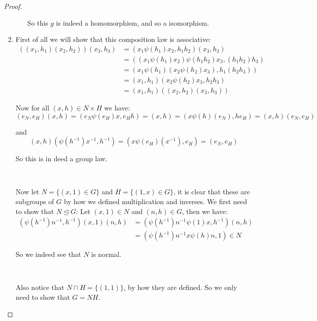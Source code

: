 \begin{exercise}
\begin{proof}
\begin{enumerate}[label = (\alph*)]
\begin{itemize}
                    So this $g$ is indeed a homomorphism, and so a isomorphism. 
                \end{itemize}
                \item First of all we will show that this composition law is associative:\begin{align*}
                    ((x_1,h_1)(x_2,h_2))(x_3,h_3) &= ({x_1}{\psi(h_1)x_2}, h_1h_2)(x_3,h_3)\\
                    &= (({x_1}{\psi(h_1)x_2}){\psi(h_1h_2)x_3}, (h_1h_2)h_3)\\
                    &= ({x_1}\psi(h_1)({x_2}{\psi(h_2)x_3}), h_1(h_2h_3))\\
                    &=(x_1,h_1)({x_2}{\psi(h_2)x_3}, h_2h_3)\\
                    &=(x_1,h_1)((x_2,h_2)(x_3,h_3))
                \end{align*}

                Now for all $(x,h)\in N\times H$ we have:\begin{equation*}
                    (e_N,e_H)(x,h) = (e_N\psi(e_H)x,{e_H}h) = (x,h) = (x\psi(h)(e_N),h{e_H}) = (x,h)(e_N,e_H) 
                \end{equation*}

                and \begin{equation*}
                    (x,h)(\psi(h^{-1})x^{-1},h^{-1}) = (x\psi(e_H)(x^{-1}),e_H) = (e_N,e_H)
                \end{equation*}

                So this is in deed a group law.

                \

                Now let $N = \{(x,1)\in G\}$ and $H = \{(1,x)\in G\}$, it is clear that these are subgroups of $G$ by how we defined multiplication and inverses.
                 We first need to show that $N\trianglelefteq G$:
                Let $(x,1)\in N$ and $(n,h)\in G$, then we have:\begin{align*}
                    (\psi(h^{-1})n^{-1},h^{-1})(x,1)(n,h) &= (\psi(h^{-1})n^{-1}\psi(1)x, h^{-1})(n,h)\\
                        &=  (\psi(h^{-1})n^{-1} x \psi(h)n, 1) \in N
                \end{align*}

                So we indeed see that $N$ is normal.

                \

                Also notice that $N\cap H = \{(1,1)\}$, by how they are defined. So we only need to show that $G = NH$.
                

\end{enumerate}
\end{proof}
\end{exercise}
